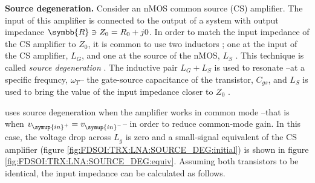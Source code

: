 \textbf{Source degeneration.}
	Consider an nMOS common source (CS) amplifier. The input of this amplifier is connected to the output of a system with output impedance $\symbb{R}\ni Z_0=R_0+j0$. In order to match the input impedance of the CS amplifier to $Z_0$, it is common to use two inductors \cite{CMOSRFIC}; one at the input of the CS amplifier, $L_G$, and one at the source of the nMOS, $L_S$ \cite{CMOSRFIC}. This technique is called \textsl{source degeneration} \cite{CMOSRFIC}. The inductive pair $L_G + L_S$ is used to resonate --at a specific frequncy, $\omega_T$-- the gate-source capacitance of the transistor, $C_{gs}$, and $L_S$ is used to bring the value of the input impedance closer to $Z_0$ \cite{CMOSRFIC}.\par

	\cite{FDSOI2} uses source degeneration when the amplifier works in common mode \cite{FDSOI2} --that is when $v_{\symup{in}^{+}} = v_{\symup{in}^{-}}$-- in order to reduce common-mode gain. In this case, the voltage drop across $L_g$ is zero and a small-signal equivalent of the CS amplifier (figure \ref{fig:FDSOI:TRX:LNA:SOURCE_DEG:initial}) is shown in figure \ref{fig:FDSOI:TRX:LNA:SOURCE_DEG:equiv}. Assuming both transistors to be identical, the input impedance can be calculated as follows.

